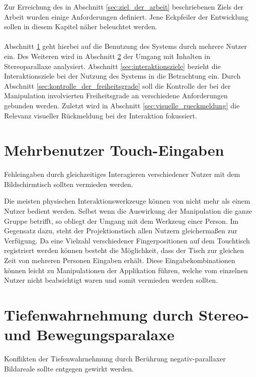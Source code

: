 Zur Erreichung des in Abschnitt \ref{sec:ziel_der_arbeit} beschriebenen Ziels der Arbeit wurden einige Anforderungen definiert. Jene Eckpfeiler der Entwicklung sollen in diesem Kapitel näher beleuchtet werden. 
\\\\
Abschnitt \ref{sec:mehrbenutzer_touch_eingaben} geht hierbei auf die Benutzung des Systems durch mehrere Nutzer ein. Des Weiteren wird in Abschnitt \ref{sec:tiefenwahrnehmung} der Umgang mit Inhalten in Stereoparallaxe analysiert.  Abschnitt \ref{sec:interaktionsziele} bezieht die Interaktionsziele bei der Nutzung des Systems in die Betrachtung ein. Durch Abschnitt \ref{sec:kontrolle_der_freiheitsgrade} soll die Kontrolle der bei der Manipulation involvierten Freiheitsgrade an verschiedene Anforderungen gebunden werden. Zuletzt wird in Abschnitt \ref{sec:visuelle_rueckmeldung} die Relevanz visueller Rückmeldung bei der Interaktion fokussiert. 


\section{Mehrbenutzer Touch-Eingaben}
\label{sec:mehrbenutzer_touch_eingaben}

	\begin{anforderung}
	\label{req:mehrbenutzer}
		Fehleingaben durch gleichzeitiges Interagieren verschiedener Nutzer mit dem Bildschirmtisch sollten vermieden werden.
	\end{anforderung}

Die meisten physischen Interaktionswerkzeuge können von nicht mehr als einem Nutzer bedient werden.  Selbst wenn die Auswirkung der Manipulation die ganze Gruppe betrifft, so obliegt der Umgang mit dem Werkzeug einer Person. Im Gegensatz dazu, steht der Projektionstisch allen Nutzern gleichermaßen zur Verfügung. Da eine Vielzahl verschiedener Fingerpositionen auf dem Touchtisch registriert werden können besteht die Möglichkeit, dass der Tisch zur gleichen Zeit von mehreren Personen Eingaben erhält. Diese Eingabekombinationen können leicht zu Manipulationen der Applikation führen, welche vom einzelnen Nutzer nicht beabsichtigt waren und somit vermieden werden sollten.


\section{Tiefenwahrnehmung durch Stereo- und Bewegungsparalaxe}
\label{sec:tiefenwahrnehmung}

	\begin{anforderung}
	\label{req:wahrnehmungskonflikte}
		Konflikten der Tiefenwahrnehmung durch Berührung negativ-parallaxer Bildareale sollte entgegen gewirkt werden.
	\end{anforderung}

